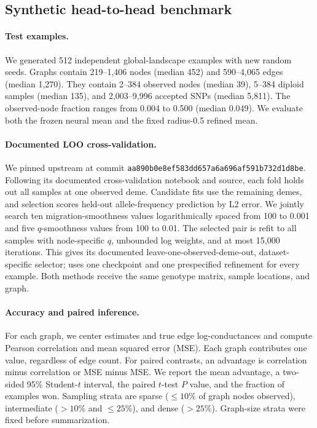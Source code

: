 \subsection{Synthetic head-to-head benchmark}

\paragraph{Test examples.}
We generated 512 independent global-landscape examples with new random seeds.
Graphs contain 219--1,406 nodes (median 452) and 590--4,065 edges (median
1,270). They contain 2--384 observed nodes (median 39), 5--384 diploid samples
(median 135), and 2,003--9,996 accepted SNPs (median 5,811). The observed-node
fraction ranges from 0.004 to 0.500 (median 0.049). We evaluate both the frozen
neural mean and the fixed radius-0.5 refined mean.

\paragraph{Documented \feems LOO cross-validation.}
We pinned upstream  at commit
\texttt{aa890b0e8ef583dd657a6a696af591b732d1d8be}. Following its documented
cross-validation notebook and source, each fold holds out all samples at one
observed deme. Candidate fits use the remaining demes, and selection scores
held-out allele-frequency prediction by L2 error. We jointly search ten
migration-smoothness values logarithmically spaced from 100 to 0.001 and five
$q$-smoothness values from 100 to 0.01. The selected pair is refit to all
samples with node-specific $q$, unbounded log weights, and at most 15,000
iterations. This gives \feems its documented leave-one-observed-deme-out,
dataset-specific selector; \dreems uses one checkpoint and one prespecified
refinement for every example. Both methods receive the same genotype matrix,
sample locations, and graph.

\paragraph{Accuracy and paired inference.}
For each graph, we center estimates and true edge log-conductances and compute
Pearson correlation and mean squared error (MSE). Each graph contributes one
value, regardless of edge count. For paired contrasts, an advantage is
\dreems correlation minus \feems correlation or \feems MSE minus \dreems MSE.
We report the mean advantage, a two-sided 95\% Student-$t$ interval, the paired
$t$-test $P$ value, and the fraction of examples won. Sampling strata are
sparse ($\leq10\%$ of graph nodes observed), intermediate ($>10\%$ and
$\leq25\%$), and dense ($>25\%$). Graph-size strata were fixed before
summarization.

